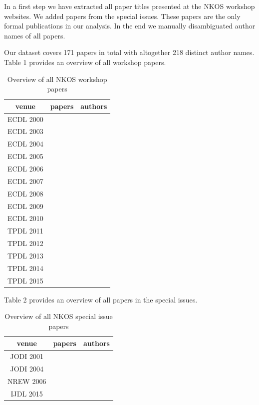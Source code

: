 \documentclass[runningheads,a4paper]{llncs}
\begin{document}
In a first step we have extracted all paper titles presented at the NKOS workshop websites. We added papers from the special issues. These papers are the only formal publications in our analysis.  In the end we manually disambiguated author names of all papers.

Our dataset covers 171 papers in total with altogether 218 distinct author names. Table 1 provides an overview of all workshop papers. 

\begin{table}
	\caption{Overview of all NKOS workshop papers}
\begin{tabular}	{|c|c|c|}		%
	\hline 
	venue& papers  & authors  \\ 
	\hline 
	ECDL 2000&  &  \\ 
	\hline 
	ECDL 2003&  &  \\ 
	\hline 
	ECDL 2004&  &  \\ 
	\hline 
	ECDL 2005&  &  \\ 
	\hline 
	ECDL 2006&  &  \\ 
	\hline 
	ECDL 2007&  &  \\ 
	\hline 
	ECDL 2008&  &  \\ 
	\hline 
	ECDL 2009&  &  \\ 
	\hline 
	ECDL 2010&  &  \\ 
	\hline 
	TPDL 2011&  &  \\ 
	\hline 
	TPDL 2012&  &  \\ 
	\hline 
	TPDL 2013&  &  \\ 
	\hline 
	TPDL 2014&  &  \\ 
	\hline 
	TPDL 2015&  &  \\ 
	\hline 
\end{tabular} 
\label{tab:workshops}
\end{table}


Table 2 provides an overview of all papers in the special issues. 

\begin{table}
	\caption{Overview of all NKOS special issue papers}
\begin{tabular}{|c|c|c|}  %
	\hline 
	venue& papers  & authors  \\ 
	\hline 
	JODI 2001&  &  \\ 
	\hline 
	JODI 2004&  &  \\ 
	\hline 
	NREW 2006&  &  \\ 
	\hline 
	IJDL 2015&  &  \\ 
	\hline 
\end{tabular} 
\label{tab:SI}
\end{table}
\end{document}
